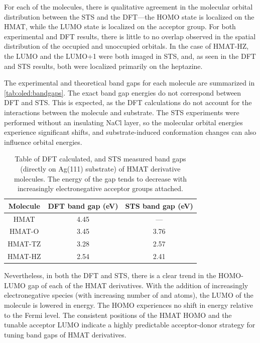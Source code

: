For each of the molecules, there is qualitative agreement in the molecular orbital distribution between the \ac{STS} and the \ac{DFT}---the \ac{HOMO} state is localized on the \ac{HMAT}, while the \ac{LUMO} state is localized on the acceptor group. For both experimental and \ac{DFT} results, there is little to no overlap observed in the spatial distribution of the occupied and unoccupied orbitals. In the case of \ac{HMAT-HZ}, the LUMO and the LUMO+1 were both imaged in \ac{STS}, and, as seen in the \ac{DFT} and STS results, both were localized primarily on the heptazine. 


The experimental and theoretical band gaps for each molecule are summarized in \autoref{tab:oled:bandgaps}. The exact band gap energies do not correspond between \ac{DFT} and \ac{STS}. This is expected, as the \ac{DFT} calculations do not account for the interactions between the molecule and substrate. The \ac{STS} experiments were performed without an insulating NaCl layer, so the molecular orbital energies experience significant shifts, and substrate-induced conformation changes can also influence orbital energies.

\begin{table} [h]
\begin{center}
    \begin{tabular}{|c|c|c|} 
    \hline
        Molecule  &  DFT band gap (eV)  &  STS band gap (eV) \\
        \hline
        HMAT     &    4.45   &  --- \\
        HMAT-O   &    3.45   & 3.76 \\
        HMAT-TZ  &    3.28   & 2.57 \\
        HMAT-HZ  &    2.54   & 2.41 \\
        \hline
    \end{tabular}
    \caption{Table of DFT calculated, and STS measured band gaps (directly on Ag(111) substrate) of HMAT derivative molecules. The energy of the gap tends to decrease with increasingly electronegative acceptor groups attached.}
    \label{tab:oled:bandgaps}
    \end{center}
\end{table}

Nevertheless, in both the \ac{DFT} and \ac{STS}, there is a clear trend in the HOMO-LUMO gap of each of the \ac{HMAT} derivatives. With the addition of increasingly electronegative species (with increasing number of  and  atoms), the \ac{LUMO} of the molecule is lowered in energy. The \ac{HOMO} experiences no shift in energy relative to the Fermi level. The consistent positions of the HMAT HOMO and the tunable acceptor LUMO indicate a highly predictable acceptor-donor strategy for tuning band gaps of HMAT derivatives.

